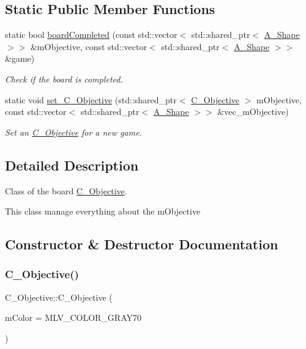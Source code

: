 \subsection*{Static Public Member Functions}
\begin{DoxyCompactItemize}
\item 
static bool \hyperlink{classObjective_aba5fe938ebccb3825d6b03cd789d6d61}{board\+Completed} (const std\+::vector$<$ std\+::shared\+\_\+ptr$<$ \hyperlink{classShape}{A_Shape} $>$$>$ \&mObjective, const std\+::vector$<$ std\+::shared\+\_\+ptr$<$ \hyperlink{classShape}{A_Shape} $>$$>$ \&game)
\begin{DoxyCompactList}\small\item\em Check if the board is completed. \end{DoxyCompactList}\item 
static void \hyperlink{classObjective_adecebbf5e11f3e778b1b7f48735a0765}{set\+\_\+\+C_Objective} (std\+::shared\+\_\+ptr$<$ \hyperlink{classObjective}{C_Objective} $>$ mObjective, const std\+::vector$<$ std\+::shared\+\_\+ptr$<$ \hyperlink{classShape}{A_Shape} $>$$>$ \&vec\+\_\+mObjective)
\begin{DoxyCompactList}\small\item\em Set an \hyperlink{classObjective}{C_Objective} for a new game. \end{DoxyCompactList}\end{DoxyCompactItemize}


\subsection{Detailed Description}
Class of the board \hyperlink{classObjective}{C_Objective}.

This class manage everything about the mObjective

\subsection{Constructor \& Destructor Documentation}
\mbox{\label{classObjective_ae515d38979a806a95f9476f4437311ab}} 
\subsubsection{\texorpdfstring{C_Objective()}{C_Objective()}\hspace{0.1cm}{\footnotesize\ttfamily [1/2]}}
{\footnotesize\ttfamily C_Objective\+::\+C_Objective (\begin{DoxyParamCaption}\item[{M\+L\+V\+\_\+\+Color}]{mColor = {\ttfamily MLV\+\_\+COLOR\+\_\+GRAY70} }\end{DoxyParamCaption})\hspace{0.3cm}{\ttfamily [explicit]}}



